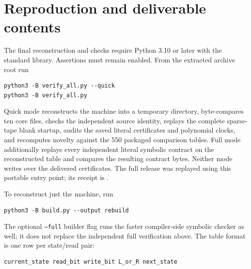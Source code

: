 \documentclass[10pt,a4paper]{article}
\theoremstyle{definition}
\begin{document}
\section{Reproduction and deliverable contents}
\label{sec:reproduce}

The final reconstruction and checks require Python 3.10 or later with
the standard library. Assertions must remain enabled. From the extracted
archive root run
\begin{lstlisting}
python3 -B verify_all.py --quick
python3 -B verify_all.py
\end{lstlisting}
Quick mode reconstructs the machine into a temporary directory,
byte-compares ten core files, checks the independent source identity,
replays the complete sparse-tape blank startup, audits the saved literal
certificates and polynomial clocks, and recomputes novelty against the
550 packaged comparison tables. Full mode additionally replays every
independent literal symbolic contract on the reconstructed table and
compares the resulting contract bytes. Neither mode writes over the
delivered certificates. The full release was replayed using this portable
entry point; its receipt is .

To reconstruct just the machine, run
\begin{lstlisting}
python3 -B build.py --output rebuild
\end{lstlisting}
The optional \texttt{--full} builder flag runs the faster compiler-side
symbolic checker as well; it does not replace the independent full
verification above. The table format is one row per state/read pair:
\begin{lstlisting}
current_state read_bit write_bit L_or_R next_state
\end{lstlisting}
\end{document}
